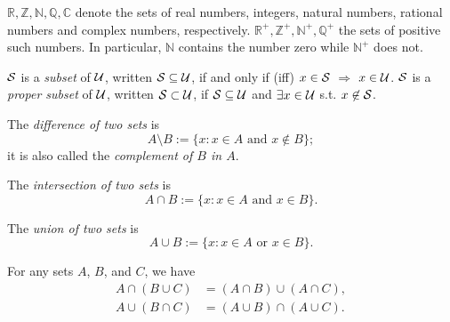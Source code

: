 \begin{ntn}
$\mathbb{R}, \mathbb{Z}, \mathbb{N}, \mathbb{Q}, \mathbb{C}$
 denote 
 the sets of real numbers, integers, natural numbers,
 rational numbers and complex numbers, respectively.
$\mathbb{R}^+, \mathbb{Z}^+, \mathbb{N}^+, \mathbb{Q}^+$
the sets of positive such numbers.
In particular, $\mathbb{N}$ contains the number zero while
 $\mathbb{N}^+$ does not.
\end{ntn}

\begin{defn}
  \label{def:subsets}
  ${\cal S}$ is a \emph{subset} of ${\cal U}$,
  written ${\cal S}\subseteq {\cal U}$,
  if and only if (iff) $x\in {\cal S}$ $\Rightarrow$ $x\in {\cal U}$.
  ${\cal S}$ is a \emph{proper subset} of ${\cal U}$,
  written ${\cal S}\subset {\cal U}$,
  if ${\cal S}\subseteq {\cal U}$
  and $\exists x\in {\cal U}$ s.t. $x\not\in{\cal S}$.
\end{defn}

\begin{defn}
  \label{eq:AminusB}
  The \emph{difference of two sets} is 
  \begin{equation}
    \label{eq:AminusB}
    A\setminus B := \{ x : x\in A \text{ and } x\not\in B \}; 
  \end{equation}
  it is also called the \emph{complement of $B$ in $A$}. 
\end{defn}

\begin{defn}
  \label{eq:AcapB}
  The \emph{intersection of two sets} is 
  \begin{equation}
    \label{eq:AcapB}
    A\cap B := \{ x : x\in A \text{ and } x\in B \}.
  \end{equation}
\end{defn}

\begin{defn}
  \label{eq:AcupB}
  The \emph{union of two sets} is 
  \begin{equation}
    \label{eq:AcupB}
    A\cup B := \{ x : x\in A \text{ or } x\in B \}.
  \end{equation}
\end{defn}

\begin{thm}
  \label{thm:distributiveLaws}
  For any sets $A$, $B$, and $C$, we have
  \begin{align}
    \label{eq:distributiveLaw1}
    A\cap (B\cup C) &= (A\cap B) \cup (A\cap C),
    \\
    \label{eq:distributiveLaw2}
    A\cup (B\cap C) &= (A\cup B) \cap (A\cup C).
  \end{align}
\end{thm}

